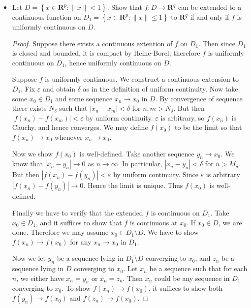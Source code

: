 \begin{itemize}
\item [23.J.] Let $D=\left\{x \in \boldsymbol{R}^p:\|x\|<1\right\}$. Show that $f: D \rightarrow \boldsymbol{R}^q$ can be extended to a continuous function on $D_1=\left\{x \in \boldsymbol{R}^p:\|x\| \leq 1\right\}$ to $\boldsymbol{R}^q$ if and only if $f$ is uniformly continuous on $D$.
\begin{proof}
	Suppose there exists a continuous extention of $f$ on $D_1$. Then since $D_1 $ is closed and bounded, it is compact by Heine-Borel; therefore $f$ is uniformly continuous on $D_1$, hence uniformly continuous on  $D$.

	Suppose $f$ is uniformly continuous. We construct a continuous extension to $D_1$. Fix $\varepsilon$ and obtain  $\delta$ as in the definition of uniform continuity. 
	Now take some $x_0 \in D_1$ and some sequence $x_n \to  x_0$ in $D$. By convergence of sequence there exists  $N_\delta$ such that  $|x_n - x_m|<\delta$ for $n, m > N_\delta$. But then $|f(x_n) - f(x_m)| < \varepsilon$ by uniform continuity. $\varepsilon$ is arbitrary, so $f(x_n)$ is Cauchy, and hence converges. We may define $f(x_0)$ to be the limit so that $f(x_n) \to  x_0$ whenever $x_n \to  x_0$.

	Now we show $f(x_0)$ is well-defined. Take another sequence $y_n \to x_0$. We know that $|x_n - y_n| \to 0$ as $n \to  \infty $. In particular, $|x_n - y_n|<\delta$ for $n > M_\delta$. But then $|f(x_n) - f(y_n)|<\varepsilon$ by uniform continuity. Since $\varepsilon$ is arbitrary $|f(x_n) - f(y_n)| \to 0$. Hence the limit is unique. Thus $f(x_0)$ is well-defined.

	Finally we have to verify that the extended $f$ is continuous on $D_1$. Take $x_0 \in D_1$, and it suffices to show that $f$ is continuous at $x_0$. If $x_0 \in D$, we are done. Therefore we may assume $x_0 \in D_1 \setminus D$. We have to show $f(x_n) \to f(x_0)$ for any $x_n \to  x_0$ in $D_1$.

	Now we let $y_n$ be a sequence lying in $D_1 \setminus D$ converging to $x_0$, and $z_n$ be a sequence lying in $D$ converging to $x_0$. Let $x_n$ be a sequence such that for each $n$, we either have $x_n = y_n$ or $x_n = z_n$. Then $x_n$ could be any sequence in $D_1$ converging to $x_0$. To show $f(x_n) \to f(x_0)$, it suffices to show both $f(y_n) \to f(x_0)$ and $f(z_n) \to  f(x_0)$.


\end{proof}
\end{itemize}
